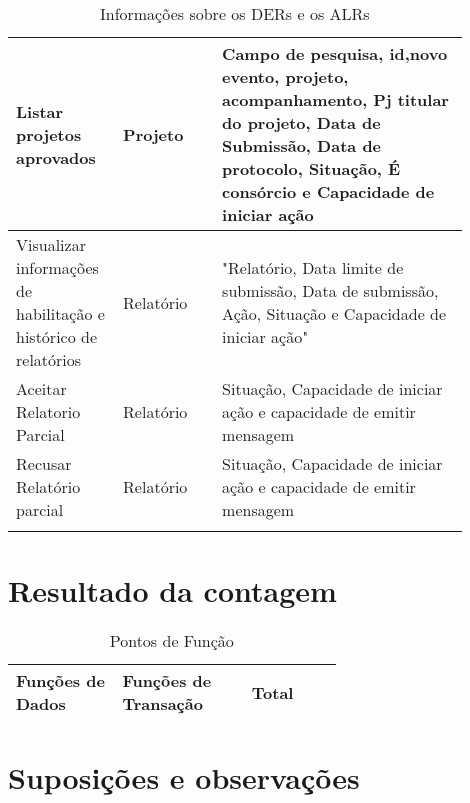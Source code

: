 \begin{longtable}{p{0.20\linewidth}p{0.20\linewidth}p{0.50\linewidth}}
	    \hline
	    Listar projetos aprovados&	Projeto&	Campo de pesquisa, id,novo evento,  projeto, acompanhamento, Pj titular do projeto, Data de Submissão, Data de protocolo, Situação, É consórcio e Capacidade de iniciar ação\\
	    \hline
	    Visualizar informações de habilitação e histórico de relatórios&	Relatório&	"Relatório, Data limite de submissão, Data de submissão, Ação, Situação e Capacidade de iniciar ação"\\

	    \hline
	    Aceitar Relatorio Parcial&	Relatório&	Situação, Capacidade de iniciar ação e capacidade de emitir mensagem\\

	    \hline
	    Recusar Relatório parcial&	Relatório&	Situação, Capacidade de iniciar ação e capacidade de emitir mensagem\\
	    \hline
	\caption{Informações sobre os DERs e os ALRs}
	\end{longtable}

\vfill
\pagebreak
\section{Resultado da contagem}

\begin{table*}[!h]
\centering
\caption{Pontos de Função}
\label{resultado_contagem}
  \begin{tabular}{|p{0.20\linewidth}|p{0.25\linewidth}|p{0.20\linewidth}|}
  \hline
  \textbf{Funções de Dados} & \textbf{Funções de Transação} & \textbf{Total} \\ 
  \hline
 
  \end{tabular}
\end{table*}

\vfill
\pagebreak
\section{Suposições e observações}

